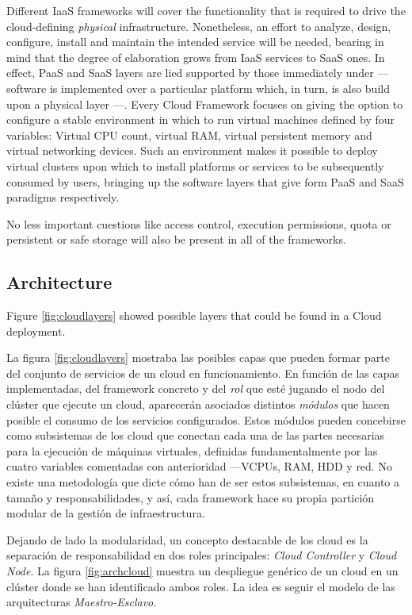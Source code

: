 Different IaaS frameworks will cover the functionality that is required to drive the cloud-defining \emph{physical} infrastructure. Nonetheless, an effort to analyze, design, configure, install and maintain the intended service will be needed, bearing in mind that the degree of elaboration grows from IaaS services to SaaS ones. In effect, PaaS and SaaS layers are lied supported by those immediately under --- software is implemented over a particular platform which, in turn, is also build upon a physical layer ---. Every Cloud Framework focuses on giving the option to configure a stable environment in which to run virtual machines defined by four variables: Virtual CPU count, virtual RAM, virtual persistent memory and virtual networking devices. Such an environment makes it possible to deploy virtual clusters upon which to install platforms or services to be subsequently consumed by users, bringing up the software layers that give form PaaS and SaaS paradigms respectively.

No less important cuestions like access control, execution permissions, quota or persistent or safe storage will also be present in all of the frameworks.


\subsection{Architecture}\label{subsec:arquitecturacloud}

\noindent Figure \ref{fig:cloudlayers} showed possible layers that could be found in a Cloud deployment.

\noindent La figura \ref{fig:cloudlayers} mostraba las posibles capas que pueden formar parte del conjunto de servicios de un cloud en funcionamiento. En funci\'on de las capas implementadas, del framework concreto y del \emph{rol} que est\'e jugando el nodo del cl\'uster que ejecute un cloud, aparecer\'an asociados distintos \emph{m\'odulos} que hacen posible el consumo de los servicios configurados. Estos m\'odulos pueden concebirse como subsistemas de los cloud que conectan cada una de las partes necesarias para la ejecuci\'on de m\'aquinas virtuales, definidas fundamentalmente por las cuatro variables comentadas con anterioridad ---VCPUs, RAM, HDD y red. No existe una metodolog\'ia que dicte c\'omo han de ser estos subsistemas, en cuanto a tama\~no y responsabilidades, y as\'i, cada framework hace su propia partici\'on modular de la gesti\'on de infraestructura.\newline

Dejando de lado la modularidad, un concepto destacable de los cloud es la separaci\'on de responsabilidad en dos roles principales: \emph{Cloud Controller} y \emph{Cloud Node}. La figura \ref{fig:archcloud} muestra un despliegue gen\'erico de un cloud en un cl\'uster donde se han identificado ambos roles. La idea es seguir el modelo de las arquitecturas \emph{Maestro-Esclavo}.\newline

